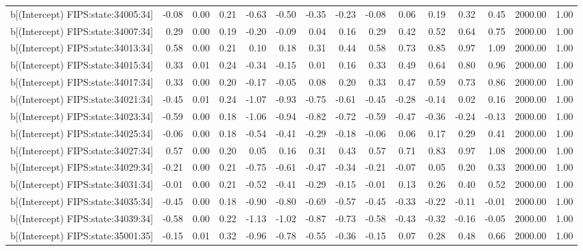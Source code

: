 \begin{table}[ht]
\begin{tabular}{rrrrrrrrrrrrrrr}
  b[(Intercept) FIPS:state:34005:34] & -0.08 & 0.00 & 0.21 & -0.63 & -0.50 & -0.35 & -0.23 & -0.08 & 0.06 & 0.19 & 0.32 & 0.45 & 2000.00 & 1.00 \\ 
  b[(Intercept) FIPS:state:34007:34] & 0.29 & 0.00 & 0.19 & -0.20 & -0.09 & 0.04 & 0.16 & 0.29 & 0.42 & 0.52 & 0.64 & 0.75 & 2000.00 & 1.00 \\ 
  b[(Intercept) FIPS:state:34013:34] & 0.58 & 0.00 & 0.21 & 0.10 & 0.18 & 0.31 & 0.44 & 0.58 & 0.73 & 0.85 & 0.97 & 1.09 & 2000.00 & 1.00 \\ 
  b[(Intercept) FIPS:state:34015:34] & 0.33 & 0.01 & 0.24 & -0.34 & -0.15 & 0.01 & 0.16 & 0.33 & 0.49 & 0.64 & 0.80 & 0.96 & 2000.00 & 1.00 \\ 
  b[(Intercept) FIPS:state:34017:34] & 0.33 & 0.00 & 0.20 & -0.17 & -0.05 & 0.08 & 0.20 & 0.33 & 0.47 & 0.59 & 0.73 & 0.86 & 2000.00 & 1.00 \\ 
  b[(Intercept) FIPS:state:34021:34] & -0.45 & 0.01 & 0.24 & -1.07 & -0.93 & -0.75 & -0.61 & -0.45 & -0.28 & -0.14 & 0.02 & 0.16 & 2000.00 & 1.00 \\ 
  b[(Intercept) FIPS:state:34023:34] & -0.59 & 0.00 & 0.18 & -1.06 & -0.94 & -0.82 & -0.72 & -0.59 & -0.47 & -0.36 & -0.24 & -0.13 & 2000.00 & 1.00 \\ 
  b[(Intercept) FIPS:state:34025:34] & -0.06 & 0.00 & 0.18 & -0.54 & -0.41 & -0.29 & -0.18 & -0.06 & 0.06 & 0.17 & 0.29 & 0.41 & 2000.00 & 1.00 \\ 
  b[(Intercept) FIPS:state:34027:34] & 0.57 & 0.00 & 0.20 & 0.05 & 0.16 & 0.31 & 0.43 & 0.57 & 0.71 & 0.83 & 0.97 & 1.08 & 2000.00 & 1.00 \\ 
  b[(Intercept) FIPS:state:34029:34] & -0.21 & 0.00 & 0.21 & -0.75 & -0.61 & -0.47 & -0.34 & -0.21 & -0.07 & 0.05 & 0.20 & 0.33 & 2000.00 & 1.00 \\ 
  b[(Intercept) FIPS:state:34031:34] & -0.01 & 0.00 & 0.21 & -0.52 & -0.41 & -0.29 & -0.15 & -0.01 & 0.13 & 0.26 & 0.40 & 0.52 & 2000.00 & 1.00 \\ 
  b[(Intercept) FIPS:state:34035:34] & -0.45 & 0.00 & 0.18 & -0.90 & -0.80 & -0.69 & -0.57 & -0.45 & -0.33 & -0.22 & -0.11 & -0.01 & 2000.00 & 1.00 \\ 
  b[(Intercept) FIPS:state:34039:34] & -0.58 & 0.00 & 0.22 & -1.13 & -1.02 & -0.87 & -0.73 & -0.58 & -0.43 & -0.32 & -0.16 & -0.05 & 2000.00 & 1.00 \\ 
  b[(Intercept) FIPS:state:35001:35] & -0.15 & 0.01 & 0.32 & -0.96 & -0.78 & -0.55 & -0.36 & -0.15 & 0.07 & 0.28 & 0.48 & 0.66 & 2000.00 & 1.00 \\ 

\end{tabular}
\end{table}
